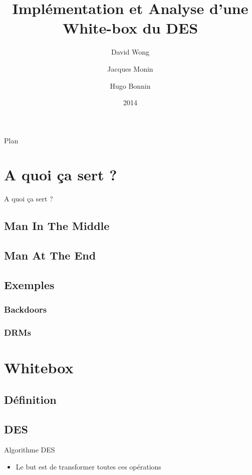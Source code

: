 \documentclass{beamer}
\author{David Wong
  \and Jacques Monin
  \and Hugo Bonnin}
\title{Implémentation et Analyse d'une White-box du DES}
\institute{Université de Bordeaux}
\date{2014}
\begin{document}
\begin{frame}
  \titlepage
\end{frame}


\begin{frame}{Plan}
  \tableofcontents
\end{frame}

\section{A quoi ça sert ?}

\begin{frame}{A quoi ça sert ?}

\end{frame}

\subsection{Man In The Middle}

\begin{frame}

\end{frame}

\subsection{Man At The End}

\subsection{Exemples}

\subsubsection{Backdoors}

\subsubsection{DRMs}

\section{Whitebox}

\subsection{Définition}

\subsection{DES}
\begin{frame}{Algorithme DES}
\begin{itemize}
\item Le but est de transformer toutes ces opérations
\begin{figure}[h]
\centering
\label{fig:DES-round}
\end{figure}
\end{itemize}
\end{frame}
\end{document}
